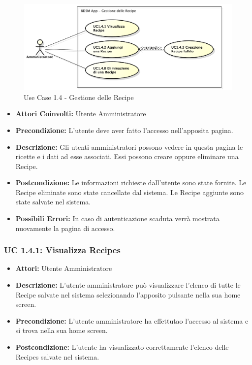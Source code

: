 \begin{figure}[htbp]
    \centering
    \centerline{\includegraphics[scale=0.5]{./images/UC1_4.pdf}}
    \caption{Use Case 1.4 - Gestione delle Recipe}
\end{figure}

\begin{itemize}
    \item \textbf{Attori Coinvolti:} Utente Amministratore

    \item \textbf{Precondizione:} L'utente deve aver fatto l'accesso nell'apposita pagina.

    \item \textbf{Descrizione:} Gli utenti amministratori possono vedere in questa pagina le ricette e i dati ad esse associati. Essi possono creare oppure eliminare una Recipe.

    \item \textbf{Postcondizione:} Le informazioni richieste dall'utente sono state fornite.
    Le Recipe eliminate sono state cancellate dal sistema.
    Le Recipe aggiunte sono state salvate nel sistema.

    \item \textbf{Possibili Errori:} In caso di autenticazione scaduta verrà mostrata nuovamente la pagina di accesso.
\end{itemize}

\subsubsection{UC 1.4.1: Visualizza Recipes}

\begin{itemize}
    \item \textbf{Attori:} Utente Amministratore
    \item \textbf{Descrizione:} L'utente amministratore può visualizzare l'elenco di tutte le Recipe salvate nel sistema selezionando l'apposito pulsante nella sua home screen.
    \item \textbf{Precondizione:} L'utente amministratore ha effettutao l'accesso al sistema e si trova nella sua home screen.
    \item \textbf{Postcondizione:} L'utente ha visualizzato correttamente l'elenco delle Recipes salvate nel sistema.
\end{itemize}

